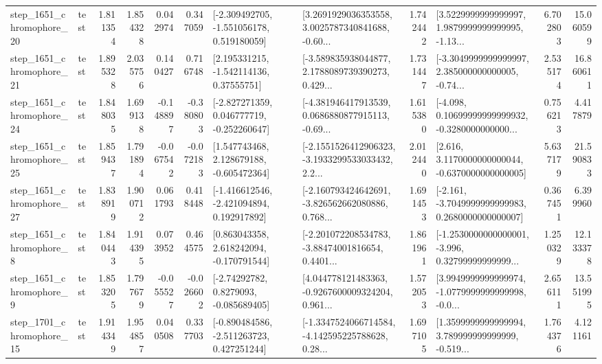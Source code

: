 \begin{tabular}{llrrrrllrlrr}
 step\_1651\_chromophore\_20 &      test &      1.811354 &    1.854328 &      0.042974 &  0.347059 &   [-2.309492705, -1.551056178, 0.519180059] &  [3.2691929036353558, 3.0025787340841688, -0.60... &       1.742442 &  [3.5229999999999997, 1.9879999999999995, -1.13... &            6.702803 &         15.060599 \\
 step\_1651\_chromophore\_21 &      test &      1.895328 &    2.035756 &      0.140427 &  0.716748 &     [2.195331215, -1.542114136, 0.37555751] &  [-3.589835938044877, 2.1788089739390273, 0.429... &       1.731447 &  [-3.3049999999999997, 2.385000000000005, -0.74... &            2.535174 &         16.860611 \\
 step\_1651\_chromophore\_24 &      test &      1.848035 &    1.699138 &     -0.148897 & -0.380803 &   [-2.827271359, 0.046777719, -0.252260647] &  [-4.381946417913539, 0.0686880877915113, -0.69... &       1.615380 &  [-4.098, 0.10699999999999932, -0.3280000000000... &            0.756213 &          4.417879 \\
 step\_1651\_chromophore\_25 &      test &      1.859437 &    1.791894 &     -0.067542 & -0.072183 &    [1.547743468, 2.128679188, -0.605472364] &  [-2.1551526412906323, -3.1933299533033432, 2.2... &       2.012440 &   [2.616, 3.1170000000000044, -0.6370000000000005] &            5.637179 &         21.590833 \\
 step\_1651\_chromophore\_27 &      test &      1.838919 &    1.900712 &      0.061793 &  0.418448 &   [-1.416612546, -2.421094894, 0.192917892] &  [-2.160793424642691, -3.826562662080886, 0.768... &       1.691453 &  [-2.161, -3.7049999999999983, 0.2680000000000007] &            0.367451 &          6.399960 \\
  step\_1651\_chromophore\_8 &      test &      1.840443 &    1.914395 &      0.073952 &  0.464575 &    [0.863043358, 2.618242094, -0.170791544] &  [-2.201072208534783, -3.88474001816654, 0.4401... &       1.861961 &  [-1.2530000000000001, -3.996, 0.32799999999999... &            1.250329 &         12.133378 \\
  step\_1651\_chromophore\_9 &      test &      1.853205 &    1.797679 &     -0.055527 & -0.026602 &      [-2.74292782, 0.8279093, -0.085689405] &  [4.044778121483363, -0.9267600009324204, 0.961... &       1.572053 &  [3.9949999999999974, -1.0779999999999998, -0.0... &            2.656111 &         13.551995 \\
 step\_1701\_chromophore\_15 &      test &      1.914349 &    1.954857 &      0.040508 &  0.337703 &   [-0.890484586, -2.511263723, 0.427251244] &  [-1.3347524066714584, -4.142595225788628, 0.28... &       1.697105 &  [1.3599999999999994, 3.789999999999999, -0.519... &            1.764376 &          4.121161 \\

\end{tabular}
